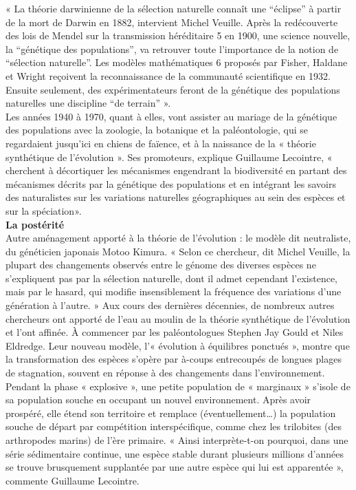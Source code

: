 \documentclass[8pt]{article}
\begin{document}
« La théorie darwinienne de la sélection naturelle connaît une “éclipse” à partir de la mort de Darwin en 1882, intervient Michel Veuille. Après la redécouverte des lois de Mendel sur la transmission héréditaire 5 en 1900, une science nouvelle, la “génétique des populations”, va retrouver toute l’importance de la notion de “sélection naturelle”. Les modèles mathématiques 6 proposés par Fisher, Haldane et Wright reçoivent la reconnaissance de la communauté scientifique en 1932. Ensuite seulement, des expérimentateurs feront de la génétique des populations naturelles une discipline “de terrain” ».\\

Les années 1940 à 1970, quant à elles, vont assister au mariage de la génétique des populations avec la zoologie, la botanique et la paléontologie, qui se regardaient jusqu’ici en chiens de faïence, et à la naissance de la « théorie synthétique de l’évolution ». Ses promoteurs, explique Guillaume Lecointre, « cherchent à décortiquer les mécanismes engendrant la biodiversité en partant des mécanismes décrits par la génétique des populations et en intégrant les savoirs des naturalistes sur les variations naturelles géographiques au sein des espèces et sur la spéciation».\\

\textbf{La postérité}\\

Autre aménagement apporté à la théorie de l’évolution : le modèle dit neutraliste, du généticien japonais Motoo Kimura. « Selon ce chercheur, dit Michel Veuille, la plupart des changements observés entre le génome des diverses espèces ne s’expliquent pas par la sélection naturelle, dont il admet cependant l’existence, mais par le hasard, qui modifie insensiblement la fréquence des variations d’une génération à l’autre. » Aux cours des dernières décennies, de nombreux autres chercheurs ont apporté de l’eau au moulin de la théorie synthétique de l’évolution et l’ont affinée. À commencer par les paléontologues Stephen Jay Gould et Niles Eldredge. Leur nouveau modèle, l’« évolution à équilibres ponctués », montre que la transformation des espèces s’opère par à-coups entrecoupés de longues plages de stagnation, souvent en réponse à des changements dans l’environnement. Pendant la phase « explosive », une petite population de « marginaux » s’isole de sa population souche en occupant un nouvel environnement. Après avoir prospéré, elle étend son territoire et remplace (éventuellement…) la population souche de départ par compétition interspécifique, comme chez les trilobites (des arthropodes marins) de l’ère primaire. « Ainsi interprète-t-on pourquoi, dans une série sédimentaire continue, une espèce stable durant plusieurs millions d’années se trouve brusquement supplantée par une autre espèce qui lui est apparentée », commente Guillaume Lecointre.\\
\end{document}
